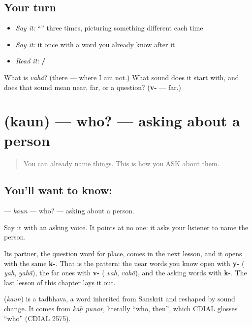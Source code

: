 \subsection*{Your turn}
\begin{itemize}
\raggedright
  \item \emph{Say it:} \textquotedblleft{}\textquotedblright{} three times, picturing something different each time
  \item \emph{Say it:} it once with a word you already know after it
  \item \emph{Read it:} \textbf{ / }
\end{itemize}

\begin{tcolorbox}[breakable,colback=teal!4,colframe=teal!35!black,title={Before you move on}]
What is \emph{vahā̃}? (there — where I am not.) What sound does it start with, and does that sound mean near, far, or a question? (\textbf{v-} — far.)
\end{tcolorbox}
\section[\texorpdfstring{\hi{कौन} (kaun)}{कौन (kaun)}]{ (kaun) — who? — asking about a person}

\label{lesson:HI-C40-who}



\begin{quote}
You can already name things. This is how you ASK about them.
\end{quote}

\subsection*{You'll want to know: }
\textbf{} — \emph{kaun} — who? — asking about a person.

Say it with an asking voice. It points at no one: it asks your listener to name the person.

Its partner, the question word for place, comes in the next lesson, and it opens with the same \textbf{k-}. That is the pattern: the near words you know open with \textbf{y-} (\textbf{} \emph{yah}, \textbf{} \emph{yahā̃}), the far ones with \textbf{v-} (\textbf{} \emph{vah}, \textbf{} \emph{vahā̃}), and the asking words with \textbf{k-}. The last lesson of this chapter lays it out.

\begin{cousinweb}
\textbf{} (\emph{kaun}) is a tadbhava, a word inherited from Sanskrit and reshaped by sound change. It comes from \emph{kaḥ punar}, literally \textquotedblleft{}who, then\textquotedblright{}, which CDIAL glosses \textquotedblleft{}who\textquotedblright{} (CDIAL 2575).
\end{cousinweb}

